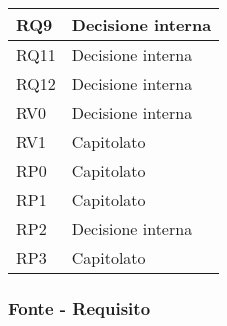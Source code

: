 \begin{center}
\begin{longtable}{|C{5cm}|C{5cm}|}
        \hline
        RQ9 &  Decisione interna \\
        \hline
        RQ11 & Decisione interna \\
        \hline
        RQ12 & Decisione interna \\
        \hline
        RV0 & Decisione interna \\
        \hline
        RV1 & Capitolato \\
        \hline
        RP0 & Capitolato \\
        \hline
        RP1 & Capitolato \\
        \hline
        RP2 & Decisione interna \\
        \hline
        RP3 & Capitolato \\
        \hline
    \end{longtable}
\end{center}


  \subsubsection{Fonte - Requisito}

